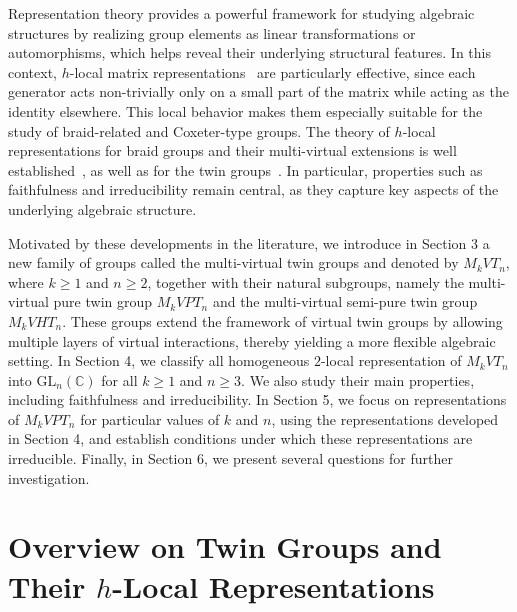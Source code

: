 \documentclass[preprint]{elsarticle}
\begin{document}
Representation theory provides a powerful framework for studying algebraic structures by realizing group elements as linear transformations or automorphisms, which helps reveal their underlying structural features. In this context, $h$-local matrix representations~\cite{Nas1} are particularly effective, since each generator acts non-trivially only on a small part of the matrix while acting as the identity elsewhere. This local behavior makes them especially suitable for the study of braid-related and Coxeter-type groups. The theory of $h$-local representations for braid groups and their multi-virtual extensions is well established~\cite{Mik, chrr, Vk2025}, as well as for the twin groups~\cite{Mayasi20251, Nasser202622}. In particular, properties such as faithfulness and irreducibility remain central, as they capture key aspects of the underlying algebraic structure. \vspace{0.1cm}

Motivated by these developments in the literature, we introduce in Section 3 a new family of groups called the multi-virtual twin groups and denoted by $M_kVT_n$, where $k\geq 1$ and $n\geq 2$, together with their natural subgroups, namely the multi-virtual pure twin group $M_kVPT_n$ and the multi-virtual semi-pure twin group $M_kVHT_n$. These groups extend the framework of virtual twin groups by allowing multiple layers of virtual interactions, thereby yielding a more flexible algebraic setting. In Section 4, we classify all homogeneous $2$-local representation of $M_kVT_n$ into $\mathrm{GL}_n(\mathbb{C})$ for all $k\geq 1$ and $n\geq 3$. We also study their main properties, including faithfulness and irreducibility. In Section 5, we focus on representations of $M_kVPT_n$ for particular values of $k$ and $n$, using the representations developed in Section 4, and establish conditions under which these representations are irreducible. Finally, in Section 6, we present several questions for further investigation.

\section{Overview on Twin Groups and Their $h$-Local Representations}
\end{document}
